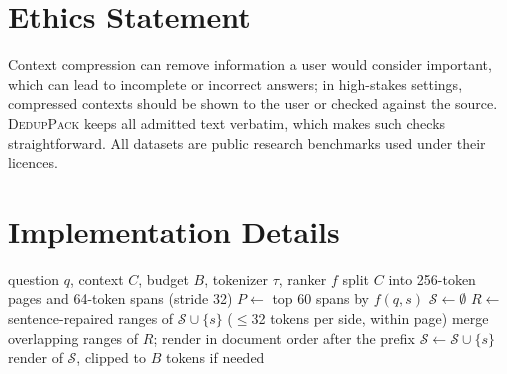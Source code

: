 \documentclass[11pt]{article}
\newcommand{\spk}{\textsc{DedupPack}}
\begin{document}
\section*{Ethics Statement}
Context compression can remove information a user would consider important, which can lead to incomplete or incorrect answers; in high-stakes settings, compressed contexts should be shown to the user or checked against the source. \spk{} keeps all admitted text verbatim, which makes such checks straightforward. All datasets are public research benchmarks used under their licences.



\appendix

\section{Implementation Details}
\label{app:impl}

\begin{algorithm}[h]
\caption{\spk{}}
\label{alg:sp}
\small
\begin{algorithmic}[1]
\Require question $q$, context $C$, budget $B$, tokenizer $\tau$, ranker $f$
\State split $C$ into 256-token pages and 64-token spans (stride 32)
\State $P\gets$ top 60 spans by $f(q,s)$
\State $\mathcal S\gets\emptyset$
  \State $R\gets$ sentence-repaired ranges of $\mathcal S\cup\{s\}$ ($\le$32 tokens per side, within page)
  \State merge overlapping ranges of $R$; render in document order after the prefix
   $\mathcal S\gets\mathcal S\cup\{s\}$ \EndIf
\EndFor
\State \Return render of $\mathcal S$, clipped to $B$ tokens if needed
\end{algorithmic}
\end{algorithm}
\end{document}
